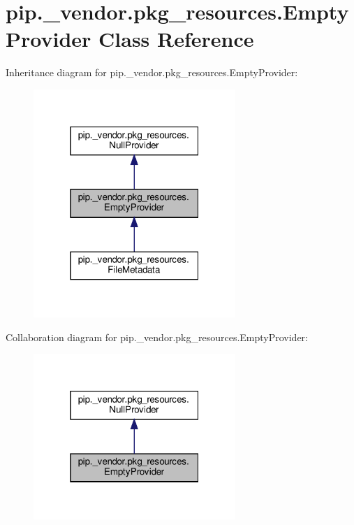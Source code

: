 \hypertarget{classpip_1_1__vendor_1_1pkg__resources_1_1EmptyProvider}{}\section{pip.\+\_\+vendor.\+pkg\+\_\+resources.\+Empty\+Provider Class Reference}
\label{classpip_1_1__vendor_1_1pkg__resources_1_1EmptyProvider}


Inheritance diagram for pip.\+\_\+vendor.\+pkg\+\_\+resources.\+Empty\+Provider\+:
\nopagebreak
\begin{figure}[H]
\begin{center}
\leavevmode
\includegraphics[width=217pt]{classpip_1_1__vendor_1_1pkg__resources_1_1EmptyProvider__inherit__graph}
\end{center}
\end{figure}


Collaboration diagram for pip.\+\_\+vendor.\+pkg\+\_\+resources.\+Empty\+Provider\+:
\nopagebreak
\begin{figure}[H]
\begin{center}
\leavevmode
\includegraphics[width=217pt]{classpip_1_1__vendor_1_1pkg__resources_1_1EmptyProvider__coll__graph}
\end{center}
\end{figure}
